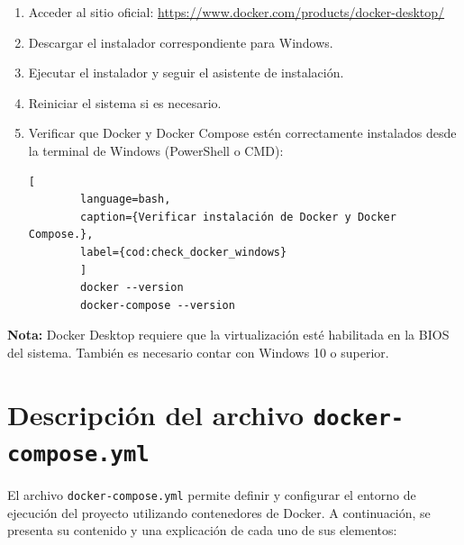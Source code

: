 \begin{enumerate}
	\item Acceder al sitio oficial: \href{https://www.docker.com/products/docker-desktop/}{https://www.docker.com/products/docker-desktop/}
	
	\item Descargar el instalador correspondiente para Windows.
	
	\item Ejecutar el instalador y seguir el asistente de instalación.
	
	\item Reiniciar el sistema si es necesario.
	
	\item Verificar que Docker y Docker Compose estén correctamente instalados desde la terminal de Windows (PowerShell o CMD):
	\begin{lstlisting}[
		language=bash,
		caption={Verificar instalación de Docker y Docker Compose.},
		label={cod:check_docker_windows}
		]
		docker --version
		docker-compose --version
	\end{lstlisting}
\end{enumerate}

\textbf{Nota:} Docker Desktop requiere que la virtualización esté habilitada en la BIOS del sistema. También es necesario contar con Windows 10 o superior.

\section{Descripción del archivo \texttt{docker-compose.yml}}
El archivo \texttt{docker-compose.yml} permite definir y configurar el entorno de ejecución del proyecto utilizando contenedores de Docker. A continuación, se presenta su contenido y una explicación de cada uno de sus elementos:
\vspace{3mm}

